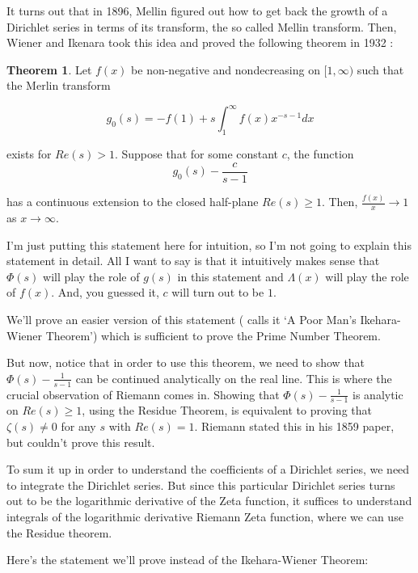 \documentclass{article}
\theoremstyle{definition}
\newtheorem{theorem}{Theorem}[section]
\begin{document}
It turns out that in 1896, Mellin figured out how to get back the growth of a Dirichlet series
in terms of its transform, the so called Mellin transform. Then, Wiener and Ikenara
took this idea and proved the following theorem in 1932 \cite{korevaar_newmans_1982}:

\begin{theorem}
    Let $ f(x) $ be non-negative and nondecreasing on $ [1,\infty) $ such that the Merlin
    transform

    \[ g_{0}(s) = - f(1) + s \int_{1}^{\infty} f(x) x^{-s - 1} dx \]
    
    exists for $ Re(s) > 1 $. Suppose that for some constant $ c $, the function 
    \[ g_{0}(s) - \frac{c}{s-1} \]

    has a continuous extension to the closed half-plane $ Re(s) \geq 1 $. Then, $ \frac{f(x)}{x} \to 1 $
    as $ x \to \infty $.
\end{theorem}

I'm just putting this statement here for intuition, so I'm not going to explain this statement in detail.
All I want to say is that it intuitively makes sense that $ \Phi(s) $ will play the role of $ g(s) $
in this statement and $ \Lambda(x) $ will play the role of $ f(x) $. And, you guessed it, $ c $ will
turn out to be $ 1 $.

We'll prove an easier version of this statement (\cite{korevaar_newmans_1982} calls it `A Poor Man's Ikehara-Wiener Theorem')
which is sufficient to prove the Prime Number Theorem.

But now, notice that in order to use this theorem, we need to show that $ \Phi(s) - \frac{1}{s - 1} $
can be continued analytically on the real line. This is where the crucial observation of Riemann
comes in. Showing that $ \Phi(s) - \frac{1}{s - 1} $ is analytic on $ Re(s) \geq 1 $, using the Residue
Theorem, is equivalent to proving that $ \zeta(s) \neq 0 $ for any $ s $ with $ Re(s) = 1 $.
Riemann stated this in his 1859 paper, but couldn't prove this result.

To sum it up in order to understand the coefficients of a Dirichlet series, we need to integrate
the Dirichlet series. But since this particular Dirichlet series turns out to be the 
logarithmic derivative of the Zeta function, it suffices to understand integrals of the
logarithmic derivative Riemann Zeta function, where we can use the Residue theorem.

Here's the statement we'll prove instead of the Ikehara-Wiener Theorem:
\end{document}
